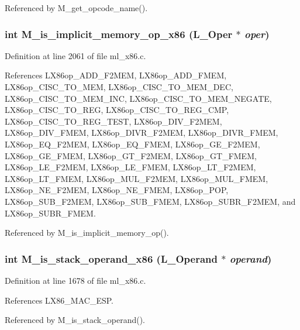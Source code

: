 Referenced by M\_\-get\_\-opcode\_\-name().
\subsubsection{\setlength{\rightskip}{0pt plus 5cm}int M\_\-is\_\-implicit\_\-memory\_\-op\_\-x86 (L\_\-Oper $\ast$ {\em oper})}\label{m__x86_8h_8094bced93f8bcf74e45e53f1d914b0e}




Definition at line 2061 of file ml\_\-x86.c.

References LX86op\_\-ADD\_\-F2MEM, LX86op\_\-ADD\_\-FMEM, LX86op\_\-CISC\_\-TO\_\-MEM, LX86op\_\-CISC\_\-TO\_\-MEM\_\-DEC, LX86op\_\-CISC\_\-TO\_\-MEM\_\-INC, LX86op\_\-CISC\_\-TO\_\-MEM\_\-NEGATE, LX86op\_\-CISC\_\-TO\_\-REG, LX86op\_\-CISC\_\-TO\_\-REG\_\-CMP, LX86op\_\-CISC\_\-TO\_\-REG\_\-TEST, LX86op\_\-DIV\_\-F2MEM, LX86op\_\-DIV\_\-FMEM, LX86op\_\-DIVR\_\-F2MEM, LX86op\_\-DIVR\_\-FMEM, LX86op\_\-EQ\_\-F2MEM, LX86op\_\-EQ\_\-FMEM, LX86op\_\-GE\_\-F2MEM, LX86op\_\-GE\_\-FMEM, LX86op\_\-GT\_\-F2MEM, LX86op\_\-GT\_\-FMEM, LX86op\_\-LE\_\-F2MEM, LX86op\_\-LE\_\-FMEM, LX86op\_\-LT\_\-F2MEM, LX86op\_\-LT\_\-FMEM, LX86op\_\-MUL\_\-F2MEM, LX86op\_\-MUL\_\-FMEM, LX86op\_\-NE\_\-F2MEM, LX86op\_\-NE\_\-FMEM, LX86op\_\-POP, LX86op\_\-SUB\_\-F2MEM, LX86op\_\-SUB\_\-FMEM, LX86op\_\-SUBR\_\-F2MEM, and LX86op\_\-SUBR\_\-FMEM.

Referenced by M\_\-is\_\-implicit\_\-memory\_\-op().
\subsubsection{\setlength{\rightskip}{0pt plus 5cm}int M\_\-is\_\-stack\_\-operand\_\-x86 (L\_\-Operand $\ast$ {\em operand})}\label{m__x86_8h_e6af9ef9a98871917df4258d42946f5e}




Definition at line 1678 of file ml\_\-x86.c.

References LX86\_\-MAC\_\-ESP.

Referenced by M\_\-is\_\-stack\_\-operand().

